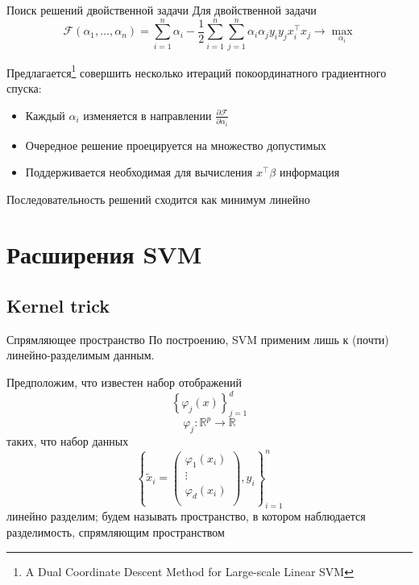 \begin{frame}{Поиск решений двойственной задачи}
	Для двойственной задачи 
	$$
		\mathcal{F}\left(\alpha_1,\dots,\alpha_n\right) = \sum\limits_{i=1}^{n}\alpha_i - \frac{1}{2}\sum\limits_{i=1}^n\sum\limits_{j=1}^n\alpha_i\alpha_jy_iy_jx_i^\intercal x_j \rightarrow \max\limits_{\alpha_i}
	$$

	Предлагается\footnote[frame]{A Dual Coordinate Descent Method for Large-scale Linear SVM} совершить несколько итераций покоординатного градиентного спуска:
	\begin{itemize}
		\item Каждый $\alpha_i$ изменяется в направлении $\frac{\partial \mathcal{F}}{\partial \alpha_i}$
		\item Очередное решение проецируется на множество допустимых
		\item Поддерживается необходимая для вычисления $x^\intercal \beta$ информация
	\end{itemize}

	Последовательность решений сходится как минимум линейно

\end{frame}

\section{Расширения SVM}
\subsection{Kernel trick}
\begin{frame}{Спрямляющее пространство}
	По построению, SVM применим лишь к (почти) линейно-разделимым данным.

	Предположим, что известен набор отображений 
	$$\left\{\varphi_j\left(x\right)\right\}_{j=1}^{d}$$
	$$\varphi_j:\mathbb{R}^p\rightarrow \mathbb{R}$$
	таких, что набор данных 
	$$\left\{\tilde{x}_i=\begin{pmatrix}
		\varphi_1\left(x_i\right) \\
		\vdots \\
		\varphi_d\left(x_i\right) \\
	\end{pmatrix}, y_i\right\}_{i=1}^{n}$$
	линейно разделим; будем называть пространство, в котором наблюдается
	разделимость, спрямляющим пространством
	
\end{frame}

